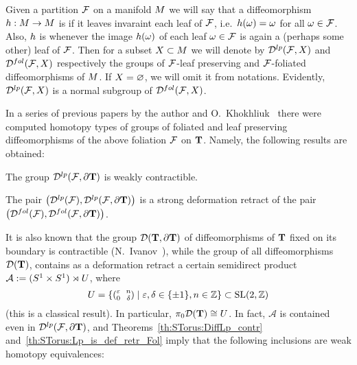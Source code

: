 Given a partition $\mathcal{F}$ on a manifold $M$ we will say that a diffeomorphism $h:M\to M$ is  if it leaves invaraint each leaf of $\mathcal{F}$, i.e.\ $h(\omega)=\omega$ for all $\omega\in\mathcal{F}$.
Also, $h$ is  whenever the image $h(\omega)$ of each leaf $\omega\in\mathcal{F}$ is again a (perhaps some other) leaf of $\mathcal{F}$.
Then for a subset $X\subset M$ we will denote by $\mathcal{D}^{lp}(\mathcal{F},X)$ and $\mathcal{D}^{fol}(\mathcal{F},X)$ respectively the groups of $\mathcal{F}$-leaf preserving and $\mathcal{F}$-foliated diffeomorphisms of $M$.
If $X=\varnothing$, we will omit it from notations.
Evidently, $\mathcal{D}^{lp}(\mathcal{F},X)$ is a normal subgroup of $\mathcal{D}^{fol}(\mathcal{F},X)$.

In a series of previous papers by the author and O.~Khokhliuk~\cite{KhokhliukMaksymenko:IndM:2020, KhokhliukMaksymenko:PIGC:2020, KhokhliukMaksymenko:fol_nbh:2022, KhokhliukMaksymenko:lens:2022, Maksymenko:lens:2023} there were computed homotopy types of groups of foliated and leaf preserving diffeomorphisms of the above foliation $\mathcal{F}$ on $\mathbf{T}$.
Namely, the following results are obtained:
\begin{theorem}\label{th:STorus:DiffLp_contr}
The group $\mathcal{D}^{lp}(\mathcal{F},\partial\mathbf{T})$ is weakly contractible.
\end{theorem}
\begin{theorem}\label{th:STorus:Lp_is_def_retr_Fol}
The pair $\bigl(\mathcal{D}^{lp}(\mathcal{F}), \mathcal{D}^{lp}(\mathcal{F},\partial\mathbf{T}) \bigr)$ is a strong deformation retract of the pair $\bigl(\mathcal{D}^{fol}(\mathcal{F}), \mathcal{D}^{fol}(\mathcal{F},\partial\mathbf{T}) \bigr)$.
\end{theorem}
It is also known that the group $\mathcal{D}(\mathbf{T},\partial\mathbf{T})$ of diffeomorphisms of $\mathbf{T}$ fixed on its boundary is contractible (N.~Ivanov~\cite{Ivanov:ZNSL:1976}), while the group of all diffeomorphisms $\mathcal{D}(\mathbf{T})$, contains as a deformation retract a certain semidirect product $\mathcal{A}:=(S^1\times S^1)\rtimes U$, where 
\[ 
    \Uman = \{ \amatr{\eps}{n}{0}{\delta} \mid \eps,\delta\in\{\pm1\}, n\in\bZ \} \subset \SL(2,\bZ)
\]
(this is a classical result).
In particular, $\pi_0\mathcal{D}(\mathbf{T}) \cong U$.
In fact, $\mathcal{A}$ is contained even in $\mathcal{D}^{lp}(\mathcal{F},\partial\mathbf{T})$, and Theorems~\ref{th:STorus:DiffLp_contr} and~\ref{th:STorus:Lp_is_def_retr_Fol} imply that the following inclusions are weak homotopy equivalences:

